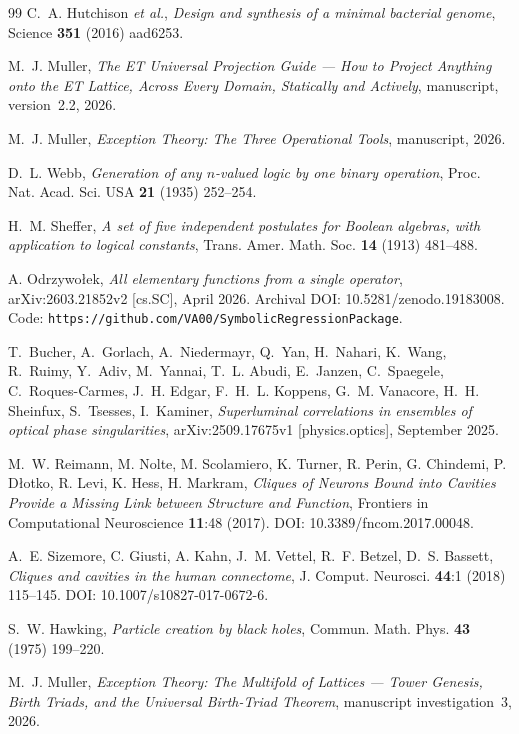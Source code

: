 \documentclass[11pt,a4paper]{article}
\theoremstyle{definition}
\theoremstyle{remark}
\begin{document}
\begin{thebibliography}{99}
C.~A. Hutchison \emph{et al.},
\emph{Design and synthesis of a minimal bacterial genome},
Science {\bf 351} (2016) aad6253.

M.~J. Muller,
\emph{The ET Universal Projection Guide --- How to Project Anything onto the ET Lattice, Across Every Domain, Statically and Actively}, manuscript, version~2.2, 2026.

M.~J. Muller,
\emph{Exception Theory: The Three Operational Tools}, manuscript, 2026.

D.~L. Webb,
\emph{Generation of any $n$-valued logic by one binary operation},
Proc. Nat. Acad. Sci. USA {\bf 21} (1935) 252--254.

H.~M. Sheffer,
\emph{A set of five independent postulates for Boolean algebras, with application to logical constants},
Trans. Amer. Math. Soc. {\bf 14} (1913) 481--488.

A. Odrzywo{\l}ek,
\emph{All elementary functions from a single operator},
arXiv:2603.21852v2 [cs.SC], April 2026.
Archival DOI: 10.5281/zenodo.19183008.
Code: \texttt{https://github.com/VA00/SymbolicRegressionPackage}.

T.~Bucher, A.~Gorlach, A.~Niedermayr, Q.~Yan, H.~Nahari, K.~Wang, R.~Ruimy,
Y.~Adiv, M.~Yannai, T.~L. Abudi, E.~Janzen, C.~Spaegele, C.~Roques-Carmes,
J.~H. Edgar, F.~H.~L. Koppens, G.~M. Vanacore, H.~H. Sheinfux, S.~Tsesses, I.~Kaminer,
\emph{Superluminal correlations in ensembles of optical phase singularities},
arXiv:2509.17675v1 [physics.optics], September 2025.

M.~W. Reimann, M. Nolte, M. Scolamiero, K. Turner, R. Perin, G. Chindemi, P. D{\l}otko, R. Levi, K. Hess, H. Markram,
\emph{Cliques of Neurons Bound into Cavities Provide a Missing Link between Structure and Function},
Frontiers in Computational Neuroscience {\bf 11}:48 (2017).
DOI: 10.3389/fncom.2017.00048.

A.~E. Sizemore, C. Giusti, A. Kahn, J.~M. Vettel, R.~F. Betzel, D.~S. Bassett,
\emph{Cliques and cavities in the human connectome},
J. Comput. Neurosci. {\bf 44}:1 (2018) 115--145.
DOI: 10.1007/s10827-017-0672-6.

S.~W. Hawking,
\emph{Particle creation by black holes},
Commun. Math. Phys. {\bf 43} (1975) 199--220.

M.~J. Muller,
\emph{Exception Theory: The Multifold of Lattices --- Tower Genesis, Birth Triads, and the Universal Birth-Triad Theorem}, manuscript investigation~3, 2026.


\end{thebibliography}
\end{document}
